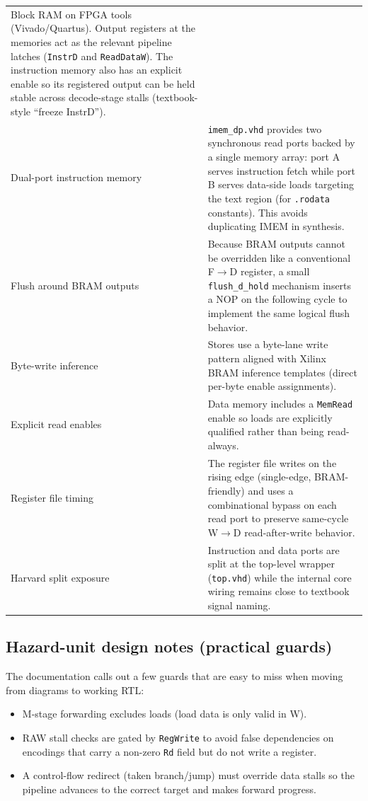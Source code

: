 \begin{longtable}{@{}p{}p{}@{}}
Block RAM on FPGA tools (Vivado/Quartus). Output registers at the memories act
as the relevant pipeline latches (\texttt{InstrD} and \texttt{ReadDataW}). The
instruction memory also has an explicit enable so its registered output can be
held stable across decode-stage stalls (textbook-style ``freeze InstrD''). \\
\addlinespace
Dual-port instruction memory &
\texttt{imem\_dp.vhd} provides two synchronous read ports backed by a single
memory array: port A serves instruction fetch while port B serves data-side
loads targeting the text region (for \texttt{.rodata} constants). This avoids
duplicating IMEM in synthesis. \\
\addlinespace
Flush around BRAM outputs &
Because BRAM outputs cannot be overridden like a conventional F$\rightarrow$D register, a small \texttt{flush\_d\_hold} mechanism inserts a NOP on the following cycle to implement the same logical flush behavior. \\
\addlinespace
Byte-write inference &
Stores use a byte-lane write pattern aligned with Xilinx BRAM inference templates (direct per-byte enable assignments). \\
\addlinespace
Explicit read enables &
Data memory includes a \texttt{MemRead} enable so loads are explicitly qualified rather than being read-always. \\
\addlinespace
Register file timing &
The register file writes on the rising edge (single-edge, BRAM-friendly) and
uses a combinational bypass on each read port to preserve same-cycle
W$\rightarrow$D read-after-write behavior. \\
\addlinespace
Harvard split exposure &
Instruction and data ports are split at the top-level wrapper (\texttt{top.vhd}) while the internal core wiring remains close to textbook signal naming. \\
\bottomrule
\end{longtable}

\subsection{Hazard-unit design notes (practical guards)}
The documentation calls out a few guards that are easy to miss when moving from
diagrams to working RTL:
\begin{itemize}[leftmargin=*]
  \item M-stage forwarding excludes loads (load data is only valid in W).
  \item RAW stall checks are gated by \texttt{RegWrite} to avoid false dependencies on encodings that carry a non-zero \texttt{Rd} field but do not write a register.
  \item A control-flow redirect (taken branch/jump) must override data stalls so the pipeline advances to the correct target and makes forward progress.
\end{itemize}

